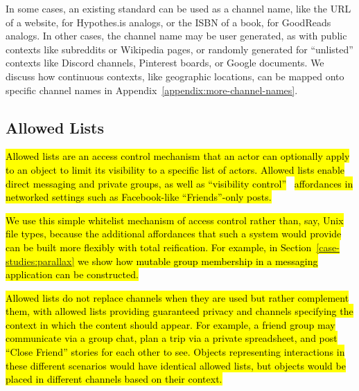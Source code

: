 In some cases, an existing standard can be used as a channel
name, like the URL of a website, for Hypothes.is analogs,
or the ISBN of a book, for GoodReads analogs.
In other cases, the channel name may be user generated,
as with public contexts like subreddits or Wikipedia pages,
or randomly generated for ``unlisted'' contexts like
Discord channels, Pinterest boards, or Google documents.
We discuss how continuous contexts, like geographic locations, can be
mapped onto specific channel names in Appendix~\ref{appendix:more-channel-names}.




\subsection{Allowed Lists}
\label{concepts:allowed-lists}

\hl{%
Allowed lists are an access control mechanism
that an actor can optionally apply to an object
to limit its visibility to a specific list of actors.
Allowed lists enable direct messaging and private groups,
as well as ``visibility control''}~\cite{visibilitycontrol, toogayforfacebook}
\hl{affordances in networked settings such as
Facebook-like ``Friends''-only posts.
}%

\hl{%
We use this simple whitelist mechanism of access control rather than,
say, Unix file types, because the additional affordances that
such a system would provide can be built more flexibly with total reification.
For example, in Section~{\ref{case-studies:parallax}} we show how mutable group
membership in a messaging application can be constructed.
}%

\hl{%
Allowed lists do not replace channels when they are used
but rather complement them,
with allowed lists providing guaranteed privacy
and channels specifying the context in which the content should appear.
For example, a friend group may communicate via a group chat,
plan a trip via a private spreadsheet, and post ``Close Friend'' stories
for each other to see.
Objects representing interactions in these different scenarios
would have identical allowed lists,
but objects would be placed in different channels based on their context.
}%
